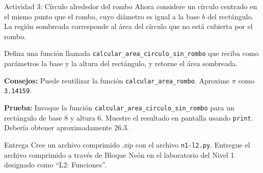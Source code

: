 \documentclass{ip-lab}
\begin{document}
\begin{sectionbox}{Actividad 3: Círculo alrededor del rombo}
Ahora considere un círculo centrado en el mismo punto que el rombo, cuyo diámetro es igual a la base $b$ del rectángulo. La región sombreada corresponde al área del círculo que no está cubierta por el rombo.

\begin{center}
\end{center}

Defina una función llamada \texttt{calcular\_area\_circulo\_sin\_rombo} que reciba como parámetros la base y la altura del rectángulo, y retorne el área sombreada.

\textbf{Consejos:} Puede reutilizar la función \texttt{calcular\_area\_rombo}. Aproxime $\pi$ como \texttt{3.14159}.

\textbf{Prueba:} Invoque la función \texttt{calcular\_area\_circulo\_sin\_rombo} para un rectángulo de base 8 y altura 6. Muestre el resultado en pantalla usando \texttt{print}. Debería obtener aproximadamente 26.3.
\end{sectionbox}

\begin{sectionbox}{Entrega}
Cree un archivo comprimido .zip con el archivo \texttt{n1-l2.py}. Entregue el archivo comprimido a través de Bloque Neón en el laboratorio del Nivel 1 designado como ``L2: Funciones''.
\end{sectionbox}
\end{document}
